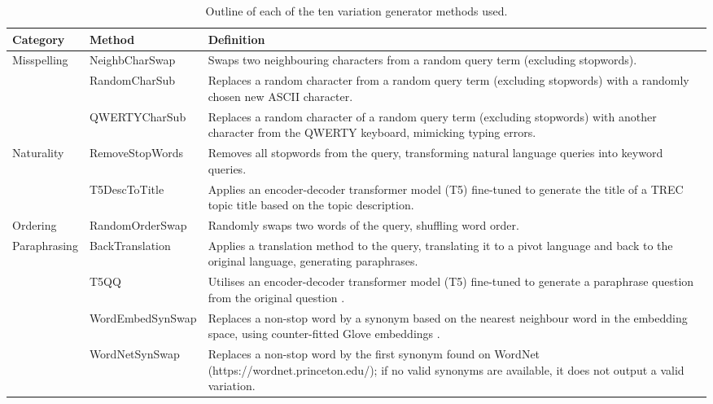 \begin{table}
\caption{Outline of each of the ten variation generator methods used.}
\label{tab:var-gens}
\begin{tabularx}{\columnwidth}{l|l|X}
\textbf{Category} &
  \textbf{Method} &
  \textbf{Definition} \\ \hline
\multirow{3}{*}{Misspelling} &
  NeighbCharSwap &
  Swaps two neighbouring characters from a random query term (excluding stopwords). \\ \cline{2-3} 
 &
  RandomCharSub &
  Replaces a random character from a random query term (excluding stopwords) with a randomly chosen new ASCII character. \\ \cline{2-3} 
 &
  QWERTYCharSub &
  Replaces a random character of a random query term (excluding stopwords) with another character from the QWERTY keyboard, mimicking typing errors. \\ \hline
\multirow{2}{*}{Naturality} &
  RemoveStopWords &
  Removes all stopwords from the query, transforming natural language queries into keyword queries. \\ \cline{2-3} 
 &
  T5DescToTitle &
  Applies an encoder-decoder transformer model (T5) fine-tuned to generate the title of a TREC topic title based on the topic description. \\ \hline
Ordering &
  RandomOrderSwap &
  Randomly swaps two words of the query, shuffling word order. \\ \hline
\multirow{4}{*}{Paraphrasing} &
  BackTranslation &
  Applies a translation method to the query, translating it to a pivot language and back to the original language, generating paraphrases. \\ \cline{2-3} 
 &
  T5QQ &
  Utilises an encoder-decoder transformer model (T5) fine-tuned to generate a paraphrase question from the original question \cite{desctitle}. \\ \cline{2-3} 
 &
  WordEmbedSynSwap &
  Replaces a non-stop word by a synonym based on the nearest neighbour word in the embedding space, using counter-fitted Glove embeddings \cite{glovefit}. \\ \cline{2-3} 
 &
  WordNetSynSwap &
  Replaces a non-stop word by the first synonym found on WordNet (https://wordnet.princeton.edu/); if no valid synonyms are available, it does not output a valid variation. \\ \hline
\end{tabularx}
\end{table}
